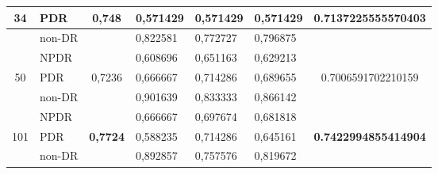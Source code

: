 \begin{table}[hbtp]
\begin{center}
\begin{tabular}{|c|l|c|l|l|l|c|}
			\multirow{-3}{*}{34}  & PDR                                                & \multirow{-3}{*}{0,748}  & 0,571429                                          & 0,571429                                         & 0,571429                                        & \multirow{-3}{*}{0.7137225555570403} \\ \hline
			& non-DR                                             &                          & 0,822581                                          & 0,772727                                         & 0,796875                                        &                                      \\ \cline{2-2} \cline{4-6}
			& NPDR                                               &                          & 0,608696                                          & 0,651163                                         & 0,629213                                        &                                      \\ \cline{2-2} \cline{4-6}
			\multirow{-3}{*}{50}  & PDR                                                & \multirow{-3}{*}{0,7236} & 0,666667                                          & 0,714286                                         & 0,689655                                        & \multirow{-3}{*}{0.7006591702210159} \\ \hline
			& non-DR                                             &                          & 0,901639                                          & 0,833333                                         & 0,866142                                        &                                      \\ \cline{2-2} \cline{4-6}
			& NPDR                                               &                          & 0,666667                                          & 0,697674                                         & 0,681818                                        &                                      \\ \cline{2-2} \cline{4-6}
			\multirow{-3}{*}{101} & PDR                                                & \multirow{-3}{*}{\textbf{0,7724}} & 0,588235                                 & 0,714286                                         & 0,645161                                        & \multirow{-3}{*}{\textbf{0.7422994855414904}} \\ \hline
			& non-DR                                             &                          & 0,892857                                          & 0,757576                                         & 0,819672                                        &                                      \\ \cline{2-2} \cline{4-6}

\end{tabular}
\end{center}
\end{table}
